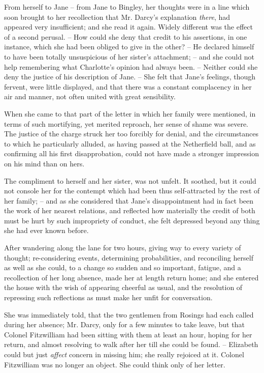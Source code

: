 From herself to Jane -- from Jane to Bingley, her
thoughts were in a line which soon brought to her recollection
that Mr. Darcy’s explanation \textit{there}, had appeared
very insufficient; and she read it again. Widely different
was the effect of a second perusal. -- How could she deny
that credit to his assertions, in one instance, which she
had been obliged to give in the other? -- He declared
himself to have been totally unsuspicious of her sister’s
attachment; -- and she could not help remembering what
Charlotte’s opinion had always been. -- Neither could she
deny the justice of his description of Jane. -- She felt that
Jane’s feelings, though fervent, were little displayed, and
that there was a constant complacency in her air and
manner, not often united with great sensibility.

When she came to that part of the letter in which
her family were mentioned, in terms of such mortifying,
yet merited reproach, her sense of shame was severe.
The justice of the charge struck her too forcibly for denial,
and the circumstances to which he particularly alluded,
as having passed at the Netherfield ball, and as confirming
all his first disapprobation, could not have made a stronger
impression on his mind than on hers.

The compliment to herself and her sister, was not
unfelt. It soothed, but it could not console her for the
contempt which had been thus self-attracted by the rest
of her family; -- and as she considered that Jane’s disappointment
had in fact been the work of her nearest
relations, and reflected how materially the credit of both
must be hurt by such impropriety of conduct, she felt
depressed beyond any thing she had ever known before.

After wandering along the lane for two hours, giving
way to every variety of thought; re-consider\-ing events,
determining probabilities, and reconciling herself as well
as she could, to a change so sudden and so important,
fatigue, and a recollection of her long absence, made her
at length return home; and she entered the house with
the wish of appearing cheerful as usual, and the resolution
of repressing such reflections as must make her unfit for
conversation.

She was immediately told, that the two gentlemen from
Rosings had each called during her absence; Mr. Darcy,
only for a few minutes to take leave, but that Colonel
Fitzwilliam had been sitting with them at least an hour,
hoping for her return, and almost resolving to walk after
her till she could be found. -- Elizabeth could but just
\textit{affect} concern in missing him; she really rejoiced at it.
Colonel Fitzwilliam was no longer an object. She could
think only of her letter.

